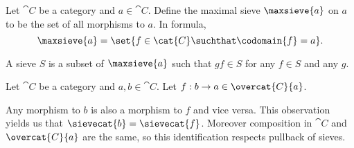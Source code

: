 

\begin{definition}[Sieve]
Let $\cat{C}$ be a category 
and $a \in \cat{C}$.
Define the maximal sieve $\maxsieve{a}$ on $a$ to be the set of all morphisms to $a$.
In formula,
\[\maxsieve{a} = \set{ f \in \cat{C} \suchthat \codomain{f} = a}.\]

A sieve $S$ is a subset of $\maxsieve{a}$ such that 
$gf \in S$ for any $f\in S$ and any $g$.
\end{definition}

\begin{remark}
Let $\cat{C}$ be a category 
and $a,b \in \cat{C}$.
Let $f:b\rightarrow a \in \overcat{C}{a}$.

Any morphism to $b$ is also a morphism to $f$ and vice versa.
This observation yields us that $\sievecat{b} = \sievecat{f}$.
Moreover composition in $\cat{C}$ and $\overcat{C}{a}$ are the same,
so this identification respects pullback of sieves.
\end{remark}
